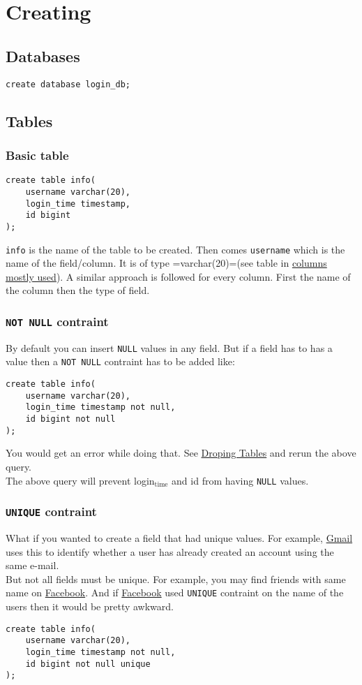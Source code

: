 \documentclass[11pt]{article}
\begin{document}
\section{Creating}
\label{sec:org969fd05}
\subsection{Databases}
\label{sec:org7fc84ad}
\begin{verbatim}
create database login_db;
\end{verbatim}
\subsection{Tables}
\label{sec:org7273247}
\subsubsection{Basic table}
\label{sec:orga2b4373}
\begin{verbatim}
create table info(
	username varchar(20),
	login_time timestamp,
	id bigint
);
\end{verbatim}
\texttt{info} is the name of the table to be created. Then
comes \texttt{username} which is the name of the field/column.
It is of type =varchar(20)=(see table in \hyperref[sec:org23c0eed]{columns mostly used}).
A similar approach is followed for every column. First
the name of the column then the type of field.
\subsubsection{\texttt{NOT NULL} contraint}
\label{sec:org8adfcc6}
By default you can insert \texttt{NULL} values in any
field. But if a field has to has a value then
a \texttt{NOT NULL} contraint has to be added like:
\begin{verbatim}
create table info(
    username varchar(20),
    login_time timestamp not null,
    id bigint not null
);
\end{verbatim}
You would get an error while doing that. See
\hyperref[org824e6fe]{Droping Tables} and rerun the above query.\\
The above query will prevent login\(_{\text{time}}\) and id
from having \texttt{NULL} values.
\subsubsection{\texttt{UNIQUE} contraint}
\label{sec:orgd331e12}
What if you wanted to create a field that had
unique values. For example, \href{https://mail.google.com}{Gmail} uses this to
identify whether a user has already created an
account using the same e-mail.\\
But not all fields must be unique. For example,
you may find friends with same name on \href{https://www.facebook.com}{Facebook}.
And if \href{https://www.facebook.com}{Facebook} used \texttt{UNIQUE} contraint on the
name of the users then it would be pretty awkward.
\begin{verbatim}
create table info(
	username varchar(20),
	login_time timestamp not null,
	id bigint not null unique
);
\end{verbatim}
\end{document}
